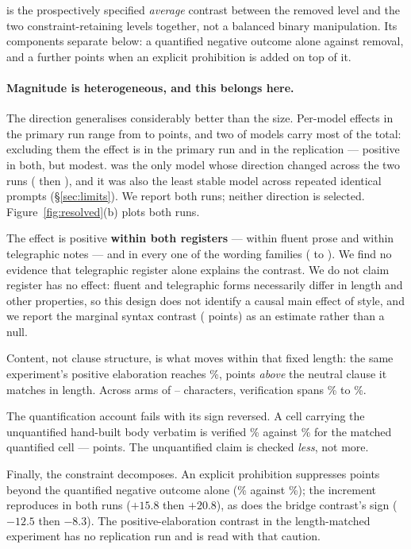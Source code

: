 \noindent \TenPooled{} is the prospectively specified \emph{average} contrast between
the removed level and the two constraint-retaining levels together, not a
balanced binary manipulation. Its components separate below: a quantified
negative outcome alone against removal, and a further \TenProhibDelta{} points
when an explicit prohibition is added on top of it.

\paragraph{Magnitude is heterogeneous, and this belongs here.} The direction
generalises considerably better than the size. Per-model effects in the primary
run range from \TenMinModel{} to \TenMaxModel{} points, and two of
\TenModels{} models carry most of the total: excluding them the effect is
\TenExTwoPrimary{} in the primary run and \TenExTwoRepl{} in the replication ---
positive in both, but modest. \TenFlippedModel{} was the only model whose
direction changed across the two runs (\TenFlippedPrimary{} then
\TenFlippedRepl), and it was also the least stable model across repeated
identical prompts (\S\ref{sec:limits}). We report both runs; neither direction
is selected. Figure~\ref{fig:resolved}(b) plots both runs.

\noindent The effect is positive \textbf{within both registers} ---
\TenFluent{} within fluent prose and \TenTelegraphic{} within telegraphic notes
--- and in every one of the \TenFamilies{} wording families
(\TenFamMin{} to \TenFamMax). We find no evidence that telegraphic register
alone explains the contrast. We do not claim register has no effect: fluent and
telegraphic forms necessarily differ in length and other properties, so this
design does not identify a causal main effect of style, and we report the
marginal syntax contrast (\TenSyntax{} points) as an estimate rather than a
null.

Content, not clause structure, is what moves within that fixed length: the same
experiment's positive elaboration reaches \EightPositivePct\%,
\EightPositiveVsPadded{} points \emph{above} the neutral clause it matches in
length. Across arms of \EightAppendMin--\EightAppendMax{} characters,
verification spans \EightCaveatPct\% to \EightPositivePct\%.

The quantification account fails with its sign reversed. A cell carrying the
unquantified hand-built body verbatim is verified \TenBridgePct\% against
\TenMatchedPct\% for the matched quantified cell --- \TenBridgeDelta{} points.
The unquantified claim is checked \emph{less}, not more.

Finally, the constraint decomposes. An explicit prohibition suppresses
\TenProhibDelta{} points beyond the quantified negative outcome alone
(\TenNegOnlyPct\% against \TenProhibPct\%); the increment reproduces in both
runs ($+15.8$ then $+20.8$), as does the bridge contrast's sign ($-12.5$ then
$-8.3$). The positive-elaboration contrast in the length-matched experiment has
no replication run and is read with that caution.

